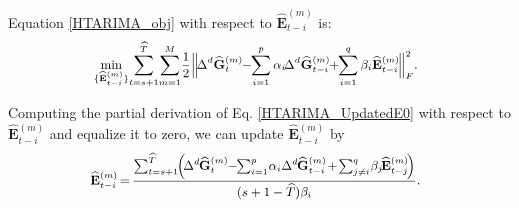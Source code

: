 \documentclass[letterpaper]{article} %
\numberwithin{theorem}{section}
\begin{document}
Equation  \eqref{HTARIMA_obj}   with respect to $\widehat{\mathbf{E}}^{(m)}_{{t-i}} $   is:
\begin{equation} \label{HTARIMA_UpdatedE0}
\small
\begin{aligned}
\hspace{-0.2cm}\mathop{\min}_{\{\widehat{\mathbf{E}}^{(m)}_{{t-i}}\} } \hspace{-0.05cm}  \sum_{t=s+1}^{\widehat{T}} \hspace{-0.05cm}  \sum_{m=1}^{M}    \hspace{-0.05cm}  \frac{1}{2}  \Big \| \hspace{-0.05cm} \Delta^d   {\widehat{\mathbf{G}}^{(m)}_{t}}  \hspace{-0.1cm} -  \hspace{-0.1cm}  \sum_{i=1}^{p} \alpha_i  \hspace{-0.05cm}  \Delta^d  {\widehat{\mathbf{G}}^{(m)}_{{t-i}}} \hspace{-0.1cm} +\hspace{-0.1cm}   \sum_{i=1}^{q} \beta_i {\widehat{\mathbf{E}}^{(m)}_{{t-i}}}  \hspace{-0.05cm}  \Big {\|} _F^2.
\end{aligned}
\end{equation}

Computing  the partial derivation of  Eq. \eqref{HTARIMA_UpdatedE0}  with respect to $\widehat{\mathbf{E}}{^{(m)}_{{t-i}}} $ and equalize it  to zero,
we can update  $\widehat{\mathbf{E}}{^{(m)}_{{t-i}}} $ by
\begin{equation} \label{HTARIMA_UpdatedEF}
\small
\begin{aligned}  \hspace{-0.2cm}
\widehat{\mathbf{E}}{^{(m)}_{{t-i}}} \hspace{-0.04cm}  = \hspace{-0.04cm} \frac{\sum_{t=s+1}^{\widehat{T}}   \hspace{-0.1cm}
	\Big( \hspace{-0.05cm} \Delta^d \hspace{-0.03cm} {\widehat{\mathbf{G}}^{(m)}_{t}}  \hspace{-0.1cm}  - \hspace{-0.1cm}   \sum_{i=1}^{p}\hspace{-0.05cm}  \alpha_i \Delta^d \hspace{-0.03cm}  {\widehat{\mathbf{G}}^{(m)}_{{t-i}}}   \hspace{-0.05cm} + \hspace{-0.05cm}  \sum_{j
		\neq i}^{q}  \hspace{-0.05cm}  \beta_j \hspace{-0.05cm}  \widehat{\mathbf{E}}{^{(m)}_{{t-j}}}\hspace{-0.05cm}  \Big)}
{(s+1-\widehat{T}) \beta_i   }.
\end{aligned}
\end{equation}
\end{document}
